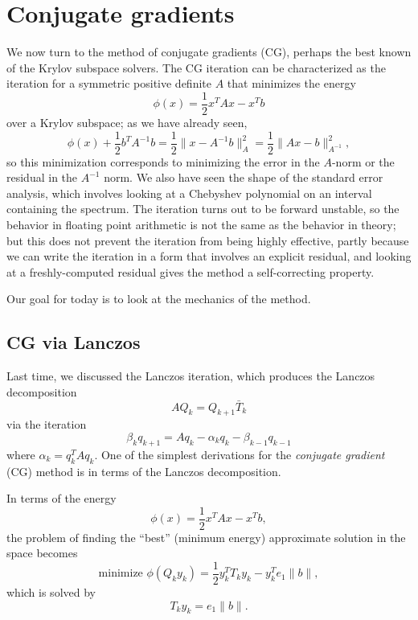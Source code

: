 \section{Conjugate gradients}

We now turn to the method of conjugate gradients (CG), perhaps the
best known of the Krylov subspace solvers.  The CG iteration can be
characterized as the iteration for a symmetric positive definite
$A$ that minimizes the energy
\[
  \phi(x) = \frac{1}{2} x^T A x - x^T b
\]
over a Krylov subspace; as we have already seen,
\[
  \phi(x) + \frac{1}{2} b^T A^{-1} b
  = \frac{1}{2} \|x-A^{-1} b\|_A^2
  = \frac{1}{2} \|Ax-b\|_{A^{-1}}^2,
\]
so this minimization corresponds to minimizing the error in the $A$-norm
or the residual in the $A^{-1}$ norm.  We also have seen the shape of
the standard error analysis, which involves looking at a Chebyshev
polynomial on an interval containing the spectrum.  The iteration turns
out to be forward unstable, so the behavior in floating point arithmetic
is not the same as the behavior in theory; but this does not prevent
the iteration from being highly effective, partly because we can
write the iteration in a form that involves an explicit residual,
and looking at a freshly-computed residual gives the method a
self-correcting property.

Our goal for today is to look at the mechanics of the method.

\subsection{CG via Lanczos}

Last time, we discussed the Lanczos iteration, which produces the
Lanczos decomposition
\[
  A Q_k = Q_{k+1} \bar{T}_k
\]
via the iteration
\[
  \beta_k q_{k+1} = A q_k - \alpha_k q_k - \beta_{k-1} q_{k-1}
\]
where $\alpha_k = q_k^T A q_k$.  One of the simplest derivations
for the {\em conjugate gradient} (CG) method is in terms of the
Lanczos decomposition.

In terms of the energy
\[
  \phi(x) = \frac{1}{2} x^T A x - x^T b,
\]
the problem of finding the ``best'' (minimum energy) approximate
solution in the space becomes
\[
  \mbox{minimize } \phi(Q_k y_k) = \frac{1}{2} y_k^T T_k y_k - y_k^T e_1 \|b\|,
\]
which is solved by
\[
  T_k y_k = e_1 \|b\|.
\]

